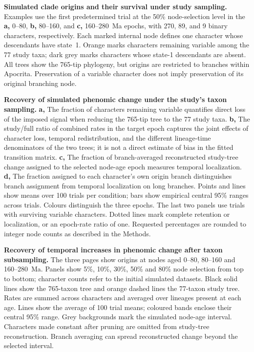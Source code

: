 
\caption{\textbf{Simulated clade origins and their survival under study sampling.}
Examples use the first predetermined trial at the 50\% node-selection level
in the \textbf{a,} 0--80, \textbf{b,} 80--160, and \textbf{c,} 160--280~Ma epochs,
with 270, 89, and 9 binary characters, respectively. Each marked internal node
defines one character whose descendants have state~1. Orange marks characters
remaining variable among the 77 study taxa; dark grey marks characters whose
state-1 descendants are absent. All trees show the 765-tip phylogeny, but
origins are restricted to branches within Apocrita. Preservation of a variable
character does not imply preservation of its original branching node.}

\caption{\textbf{Recovery of simulated phenomic change under the study's taxon sampling.}
\textbf{a,} The fraction of characters remaining variable quantifies direct
loss of the imposed signal when reducing the 765-tip tree to the 77 study taxa.
\textbf{b,} The study/full ratio of combined rates in the target epoch captures
the joint effects of character loss, temporal redistribution, and the different
lineage-time denominators of the two trees; it is not a direct estimate of
bias in the fitted transition matrix.
\textbf{c,} The fraction of branch-averaged reconstructed study-tree change
assigned to the selected node-age epoch measures temporal localization.
\textbf{d,} The fraction assigned to each character's own origin branch
distinguishes branch assignment from temporal localization on long branches.
Points and lines show means over 100 trials per condition; bars show empirical
central 95\% ranges across trials. Colours distinguish the three epochs.
The last two panels use trials with surviving variable characters.
Dotted lines mark complete retention or localization, or an epoch-rate ratio
of one. Requested percentages are rounded to integer node counts as described
in the Methods.}

\caption{\textbf{Recovery of temporal increases in phenomic change after taxon subsampling.}
The three pages show origins at nodes aged 0--80, 80--160 and 160--280~Ma.
Panels show 5\%, 10\%, 30\%, 50\% and 80\% node selection from top to bottom;
character counts refer to the initial simulated datasets.
Black solid lines show the 765-taxon tree and orange dashed lines the
77-taxon study tree. Rates are summed across characters and averaged over
lineages present at each age. Lines show the average of 100 trial means; coloured bands enclose
their central 95\% range.
Grey backgrounds mark the simulated node-age interval. Characters made
constant after pruning are omitted from study-tree reconstruction.
Branch averaging can spread reconstructed change beyond the selected interval.}

